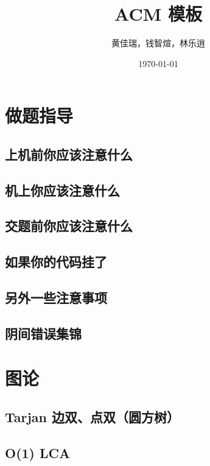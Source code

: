 \documentclass[10pt, a4paper, oneside]{ctexart}
\title{ACM 模板}
\author{黄佳瑞，钱智煊，林乐逍}
\date{\today}
\begin{document}
    \scriptsize
    \maketitle
    \newpage
    
    \begin{multicols}{2}
        \tableofcontents
        \newpage

        \section{做题指导}
        \subsection{上机前你应该注意什么}
        
        \subsection{机上你应该注意什么}
        
        \subsection{交题前你应该注意什么}
        
        \subsection{如果你的代码挂了}
        
        \subsection{另外一些注意事项}
        
        \subsection{阴间错误集锦}
        
        \newpage

        \section{图论}
        \subsection{Tarjan 边双、点双（圆方树）}
        
        \subsection{O(1) LCA}
        

\end{multicols}
\end{document}
